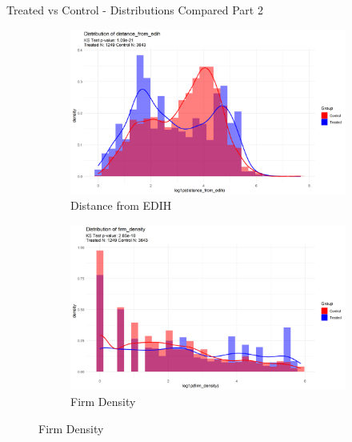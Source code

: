 \documentclass{beamer}
\begin{document}
\begin{frame}{Treated vs Control - Distributions Compared Part 2}
    \begin{figure}[ht]
        \centering
        \begin{subfigure}[b]{0.45\textwidth}
            
            \includegraphics[width=\linewidth]{../Output/distrib_compare_distance_from_edih_allcountries.png}
            \caption{Distance from EDIH}

        \end{subfigure}
        \hfill
        \begin{subfigure}[b]{0.45\textwidth}
            \centering
            \includegraphics[width=\linewidth]{../Output/distrib_compare_firm_density_allcountries.png}
            \caption{Firm Density}


\end{subfigure}
\end{figure}
\end{frame}
\end{document}
